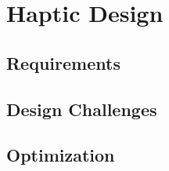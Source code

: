\chapter{Haptic Design}
\section{Requirements}

\section{Design Challenges}

\section{Optimization}	
